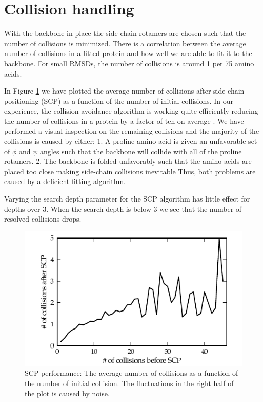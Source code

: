 \section{Collision handling}
With the backbone in place the side-chain rotamers are chosen such that the number of collisions is minimized.
There is a correlation between the average number of collisions in a fitted protein and how well we are able to fit it to the backbone. 
For small RMSDs, the number of collisions is around 1 per 75 amino acids.

In Figure \ref{fig:plot_scp} we have plotted the average number of collisions after side-chain positioning (SCP) as a function of the number of initial collisions.
In our experience, the collision avoidance algorithm is working quite efficiently reducing the number of collisions in a protein by a factor of ten on average .
We have performed a visual inspection on the remaining collisions and the majority of the collisions is caused by either: 
1. A proline amino acid is given an unfavorable set of $\phi$ and $\psi$ angles such that the backbone will collide with all of the proline rotamers.
2. The backbone is folded unfavorably such that the amino acids are placed too close making side-chain collisions inevitable
Thus, both problems are caused by a deficient fitting algorithm.

Varying the search depth parameter for the SCP algorithm has little effect for depths over 3.
When the search depth is below 3 we see that the number of resolved collisions drops.

\label{sec:evaluation_handling_side-chains}
\begin{figure}
	\centering
	\hspace*{-3.5mm}\includegraphics[width=1.1\columnwidth]{figures/plot_scp}
	\caption{SCP performance: The average number of collisions as a function of the number of initial collision. The fluctuations in the right half of the plot is caused by noise.}
	\label{fig:plot_scp}
\end{figure}


